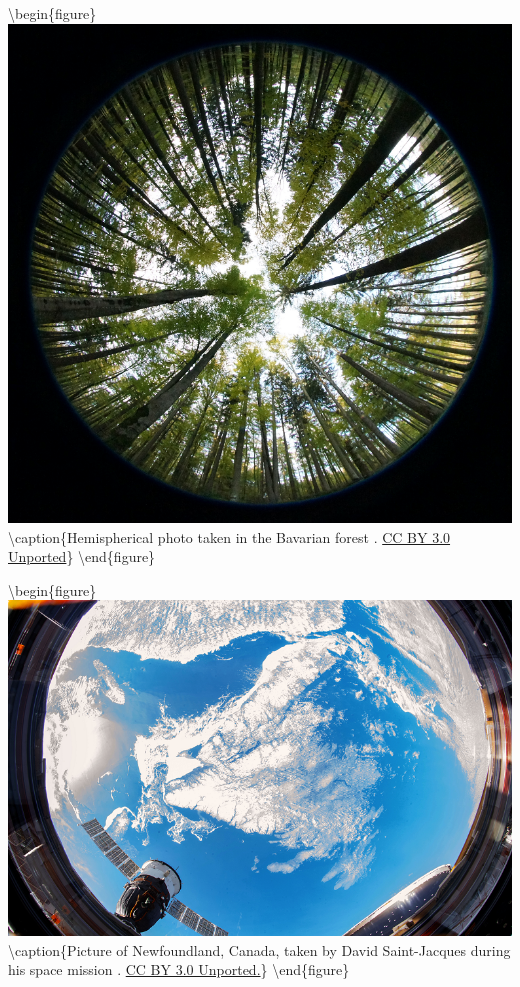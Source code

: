 \documentclass[
]{book}
\begin{document}
\textbackslash begin\{figure\}
\includegraphics[width=0.9\linewidth]{images/12-hemispherical-lens} \textbackslash caption\{Hemispherical photo taken in the Bavarian forest \citep{wegmann_hemispherical_2011}. \href{https://creativecommons.org/licenses/by/3.0/}{CC BY 3.0 Unported}\}\label{fig:12-hemispherical-lens}
\textbackslash end\{figure\}

\textbackslash begin\{figure\}
\includegraphics[width=0.9\linewidth]{images/12-newfoundland_from_space} \textbackslash caption\{Picture of Newfoundland, Canada, taken by David Saint-Jacques during his space mission \citep{canadian_space_agency_newfoundland_2019}. \href{https://creativecommons.org/licenses/by/3.0/}{CC BY 3.0 Unported.}\}\label{fig:12-newfoundland-from-space}
\textbackslash end\{figure\}
\end{document}
